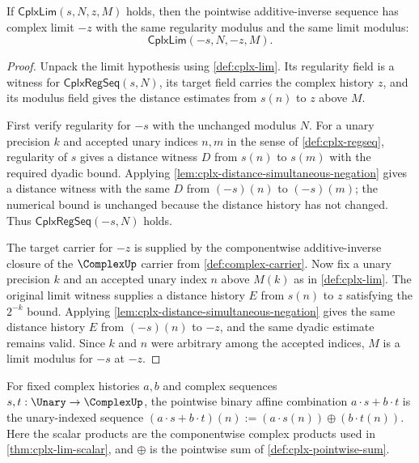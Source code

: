 \begin{theorem}
\label{thm:cplx-lim-pointwise-negation}
If $\mathsf{CplxLim}(s,N,z,M)$ holds, then the pointwise additive-inverse sequence has complex limit $-z$ with the same regularity modulus and the same limit modulus:
$$
\mathsf{CplxLim}(-s,N,-z,M).
$$
\end{theorem}
\begin{proof}
Unpack the limit hypothesis using \autoref{def:cplx-lim}. Its regularity field is a witness for $\mathsf{CplxRegSeq}(s,N)$, its target field carries the complex history $z$, and its modulus field gives the distance estimates from $s(n)$ to $z$ above $M$.

First verify regularity for $-s$ with the unchanged modulus $N$. For a unary precision $k$ and accepted unary indices $n,m$ in the sense of \autoref{def:cplx-regseq}, regularity of $s$ gives a distance witness $D$ from $s(n)$ to $s(m)$ with the required dyadic bound. Applying \autoref{lem:cplx-distance-simultaneous-negation} gives a distance witness with the same $D$ from $(-s)(n)$ to $(-s)(m)$; the numerical bound is unchanged because the distance history has not changed. Thus $\mathsf{CplxRegSeq}(-s,N)$ holds.

The target carrier for $-z$ is supplied by the componentwise additive-inverse closure of the $\ComplexUp$ carrier from \autoref{def:complex-carrier}. Now fix a unary precision $k$ and an accepted unary index $n$ above $M(k)$ as in \autoref{def:cplx-lim}. The original limit witness supplies a distance history $E$ from $s(n)$ to $z$ satisfying the $2^{-k}$ bound. Applying \autoref{lem:cplx-distance-simultaneous-negation} gives the same distance history $E$ from $(-s)(n)$ to $-z$, and the same dyadic estimate remains valid. Since $k$ and $n$ were arbitrary among the accepted indices, $M$ is a limit modulus for $-s$ at $-z$.
\end{proof}

\begin{definition}
\label{def:cplx-pointwise-binary-affine-combination}
For fixed complex histories $a,b$ and complex sequences $s,t:\Unary\to\ComplexUp$, the pointwise binary affine combination $a\cdot s+b\cdot t$ is the unary-indexed sequence $(a\cdot s+b\cdot t)(n):=(a\cdot s(n))\oplus(b\cdot t(n))$. Here the scalar products are the componentwise complex products used in \autoref{thm:cplx-lim-scalar}, and $\oplus$ is the pointwise sum of \autoref{def:cplx-pointwise-sum}.
\end{definition}

